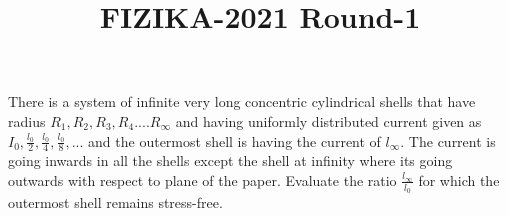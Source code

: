 \documentclass[11pt,a4paper]{scrartcl}
\title{FIZIKA-2021 Round-1}
\author{}
\date{}
\begin{document}

\begin{problem}
There is a system of infinite very long concentric cylindrical shells that have radius $R_1,R_2,R_3,R_4....R_{\infty}$ and having uniformly distributed current given as $I_0,\frac{l_0}{2},\frac{l_0}{4},\frac{l_0}{8},...$ and the outermost shell is having the current of $l_{\infty}$. The current is going inwards in all the shells except the shell at infinity where its going outwards with respect to plane of the paper. Evaluate the ratio $\frac{l_{\infty}}{l_0}$ for which the outermost shell remains stress-free.
\begin{center}
    

\begin{tikzpicture}[x=0.75pt,y=0.75pt,yscale=-1,xscale=1]


\end{tikzpicture}
\end{center}
\end{problem}
\end{document}
